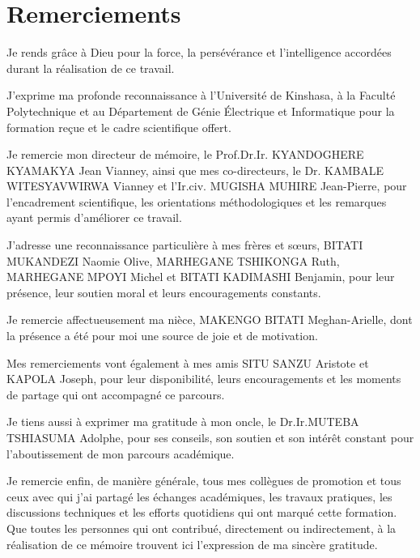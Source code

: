 \chapter*{Remerciements}

Je rends grâce à Dieu pour la force, la persévérance et l'intelligence accordées durant la réalisation de ce travail.

J'exprime ma profonde reconnaissance à l'Université de Kinshasa, à la Faculté Polytechnique et au Département de Génie Électrique et Informatique pour la formation reçue et le cadre scientifique offert.

Je remercie mon directeur de mémoire, le Prof.Dr.Ir. KYANDOGHERE KYAMAKYA Jean Vianney, ainsi que mes co-directeurs, le Dr. KAMBALE WITESYAVWIRWA Vianney et l'Ir.civ. MUGISHA MUHIRE Jean-Pierre, pour l'encadrement scientifique, les orientations méthodologiques et les remarques ayant permis d'améliorer ce travail.

J'adresse une reconnaissance particulière à mes frères et sœurs, BITATI MUKANDEZI Naomie Olive, MARHEGANE TSHIKONGA Ruth, MARHEGANE MPOYI Michel et BITATI KADIMASHI Benjamin, pour leur présence, leur soutien moral et leurs encouragements constants.

Je remercie affectueusement ma nièce, MAKENGO BITATI Meghan-Arielle, dont la présence a été pour moi une source de joie et de motivation.

Mes remerciements vont également à mes amis SITU SANZU Aristote et KAPOLA Joseph, pour leur disponibilité, leurs encouragements et les moments de partage qui ont accompagné ce parcours.

Je tiens aussi à exprimer ma gratitude à mon oncle, le Dr.Ir.MUTEBA TSHIASUMA Adolphe, pour ses conseils, son soutien et son intérêt constant pour l'aboutissement de mon parcours académique.

Je remercie enfin, de manière générale, tous mes collègues de promotion et tous ceux avec qui j'ai partagé les échanges académiques, les travaux pratiques, les discussions techniques et les efforts quotidiens qui ont marqué cette formation. Que toutes les personnes qui ont contribué, directement ou indirectement, à la réalisation de ce mémoire trouvent ici l'expression de ma sincère gratitude.
